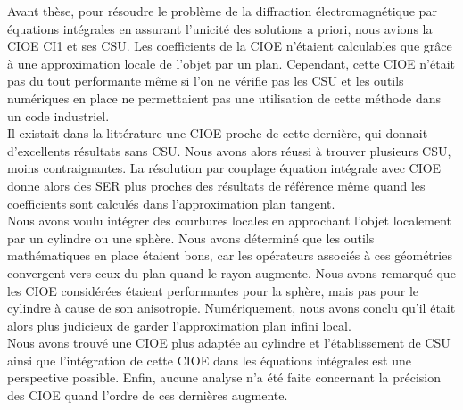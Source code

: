 
Avant thèse, pour résoudre le problème de la diffraction électromagnétique par équations intégrales en assurant l'unicité des solutions a priori, nous avions la CIOE CI1 et ses CSU. Les coefficients de la CIOE n'étaient calculables que grâce à une approximation locale de l'objet par un plan. Cependant, cette CIOE n'était pas du tout performante même si l’on ne vérifie pas les CSU et les outils numériques en place ne permettaient pas une utilisation de cette méthode dans un code industriel.\\

Il existait dans la littérature une CIOE proche de cette dernière, qui donnait d'excellents résultats sans CSU. Nous avons alors réussi à trouver plusieurs CSU, moins contraignantes. La résolution par couplage équation intégrale avec CIOE donne alors des SER plus proches des résultats de référence même quand les coefficients sont calculés dans l'approximation plan tangent.\\

Nous avons voulu intégrer des courbures locales en approchant l'objet localement par un cylindre ou une sphère. Nous avons déterminé que les outils mathématiques en place étaient bons, car les opérateurs associés à ces géométries convergent vers ceux du plan quand le rayon augmente. Nous avons remarqué que les CIOE considérées étaient performantes pour la sphère, mais pas pour le cylindre à cause de son anisotropie. Numériquement, nous avons conclu qu'il était alors plus judicieux de garder l’approximation plan infini local.\\

Nous avons trouvé une CIOE plus adaptée au cylindre et l'établissement de CSU ainsi que l'intégration de cette CIOE dans les équations intégrales est une perspective possible. Enfin, aucune analyse n'a été faite concernant la précision des CIOE quand l'ordre de ces dernières augmente.
